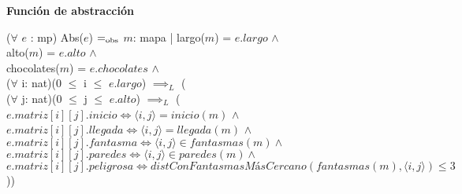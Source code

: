 \documentclass{book}
\begin{document}
        $ $

    \textbf{Función de abstracción}


        ($\forall$ $e$ : mp) Abs($e$) $=_{\mathrm{obs}}$ $m$: mapa | largo($m$) = $e.largo$ $\wedge$ \\
            \text{}\qquad alto($m$) = $e.alto$ $\wedge$ \\
            \text{}\qquad chocolates($m$) = $e.chocolates$ $\wedge$ \\
            \text{}\qquad ($\forall$ i: nat)(0 $\leq$ i $\leq$ $e.largo$) $\implies_L$ ( \\
                \text{}\qquad\quad ($\forall$ j: nat)(0 $\leq$ j $\leq$ $e.alto$) $\implies_L$ ( \\
                \text{}\qquad\quad $e.matriz[i][j].inicio \iff \langle i,j\rangle = inicio(m)$ $\wedge$ \\
                \text{}\qquad\quad $e.matriz[i][j].llegada \iff \langle i,j\rangle = llegada(m)$ $\wedge$ \\
                \text{}\qquad\quad $e.matriz[i][j].fantasma \iff \langle i,j \rangle \in fantasmas(m) \wedge $ \\
                \text{}\qquad\quad $e.matriz[i][j].paredes \iff \langle i,j \rangle \in paredes(m) \wedge $ \\
                \text{}\qquad\quad $e.matriz[i][j].peligrosa \iff distConFantasmasMásCercano(fantasmas(m), \langle i,j \rangle) \leq 3$))

    \newpage
\end{document}
